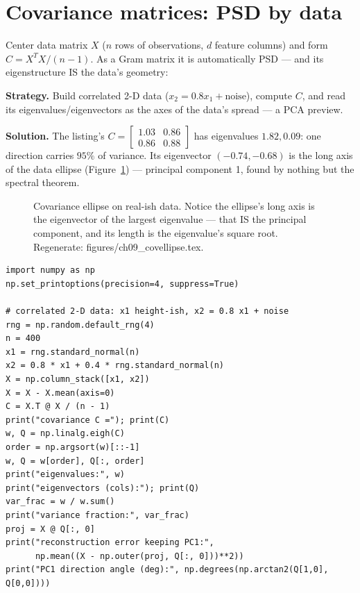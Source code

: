 \section{Covariance matrices: PSD by data}\label{sec:covar}

Center data matrix $X$ ($n$ rows of observations, $d$ feature columns)
and form $C=X^{T}X/(n-1)$. As a Gram matrix it is automatically PSD ---
and its eigenstructure IS the data's geometry:

\begin{example}\label{ex:covspec}
\textbf{Strategy.} Build correlated 2-D data ($x_2=0.8x_1+\text{noise}$),
compute $C$, and read its eigenvalues/eigenvectors as the axes of the
data's spread --- a PCA preview.

\textbf{Solution.} The listing's $C=\begin{bmatrix}1.03&0.86\\0.86&0.88\end{bmatrix}$
has eigenvalues $1.82,0.09$: one direction carries $95\%$ of variance.
Its eigenvector $(-0.74,-0.68)$ is the long axis of the data ellipse
(Figure~\ref{fig:covellipse}) --- principal component 1, found by nothing
but the spectral theorem.
\end{example}

\begin{figure}[htbp]
\centering

\caption{Covariance ellipse on real-ish data. Notice the ellipse's long
axis is the eigenvector of the largest eigenvalue --- that IS the
principal component, and its length is the eigenvalue's square root.
Regenerate: \ttfamily figures/ch09\_covellipse.tex.}
\label{fig:covellipse}
\end{figure}

\begin{lstlisting}[caption={\ttfamily code/ch09\_covariance.py --- PCA
directions fall straight out of \ttfamily np.linalg.eigh on the
covariance matrix.}]
import numpy as np
np.set_printoptions(precision=4, suppress=True)

# correlated 2-D data: x1 height-ish, x2 = 0.8 x1 + noise
rng = np.random.default_rng(4)
n = 400
x1 = rng.standard_normal(n)
x2 = 0.8 * x1 + 0.4 * rng.standard_normal(n)
X = np.column_stack([x1, x2])
X = X - X.mean(axis=0)
C = X.T @ X / (n - 1)
print("covariance C ="); print(C)
w, Q = np.linalg.eigh(C)
order = np.argsort(w)[::-1]
w, Q = w[order], Q[:, order]
print("eigenvalues:", w)
print("eigenvectors (cols):"); print(Q)
var_frac = w / w.sum()
print("variance fraction:", var_frac)
proj = X @ Q[:, 0]
print("reconstruction error keeping PC1:",
      np.mean((X - np.outer(proj, Q[:, 0]))**2))
print("PC1 direction angle (deg):", np.degrees(np.arctan2(Q[1,0], Q[0,0])))
\end{lstlisting}

